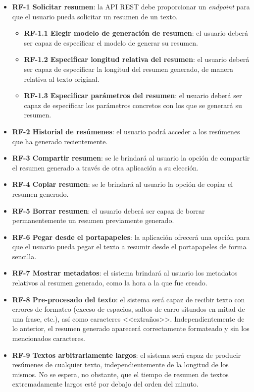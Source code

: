 \begin{itemize}[\textbullet]
	\item \textbf{RF-1 Solicitar resumen}: la API REST debe proporcionar un \emph{endpoint} para que el usuario pueda solicitar un resumen de un texto.
	\begin{itemize}[◦]
		\item \textbf{RF-1.1 Elegir modelo de generación de resumen}: el usuario deberá ser capaz de especificar el modelo de generar su resumen.
		\item \textbf{RF-1.2 Especificar longitud relativa del resumen}: el usuario deberá ser capaz de especificar la longitud del resumen generado, de manera relativa al texto original.
		\item \textbf{RF-1.3 Especificar parámetros del resumen}: el usuario deberá ser capaz de especificar los parámetros concretos con los que se generará su resumen.
	\end{itemize}
	\item \textbf{RF-2 Historial de resúmenes}: el usuario podrá acceder a los resúmenes que ha generado recientemente.
	\item \textbf{RF-3 Compartir resumen}: se le brindará al usuario la opción de compartir el resumen generado a través de otra aplicación a su elección.
	\item \textbf{RF-4 Copiar resumen}: se le brindará al usuario la opción de copiar el resumen generado.
	\item \textbf{RF-5 Borrar resumen}: el usuario deberá ser capaz de borrar permanentemente un resumen previamente generado.
	\item \textbf{RF-6 Pegar desde el portapapeles}: la aplicación ofrecerá una opción para que el usuario pueda pegar el texto a resumir desde el portapapeles de forma sencilla.
	\item \textbf{RF-7 Mostrar metadatos}: el sistema brindará al usuario los metadatos relativos al resumen generado, como la hora a la que fue creado.
	\item \textbf{RF-8 Pre-procesado del texto}: el sistema será capaz de recibir texto con errores de formateo (exceso de espacios, saltos de carro situados en mitad de una frase, etc.), así como caracteres <<extraños>>. Independientemente de lo anterior, el resumen generado aparecerá correctamente formateado y sin los mencionados caracteres.
	\item \textbf{RF-9 Textos arbitrariamente largos}: el sistema será capaz de producir resúmenes de cualquier texto, independientemente de la longitud de los mismos. No se espera, no obstante, que el tiempo de resumen de textos extremadamente largos esté por debajo del orden del minuto.
\end{itemize}

